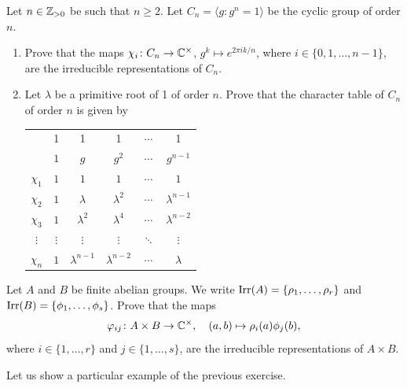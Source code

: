 \begin{exercise}
	Let $n\in\mathbb{Z}_{>0}$ be such that $n\geq2$. Let 
$C_n=\langle g:g^n=1\rangle$ be the cyclic group of order $n$.
\begin{enumerate}
    \item Prove that the maps  
        $\chi_i\colon C_n\to\mathbb{C}^\times$, $g^k\mapsto e^{2\pi ik/n}$, where $i\in\{0,1,\dots,n-1\}$, 
        are the irreducible representations of $C_n$. 
    \item Let $\lambda$ be a primitive root of 1 of order $n$. Prove that 
        the character table of $C_n$ of order $n$ is given by 
	\begin{center}
		\begin{tabular}{|c|ccccc|}
			\hline 
			& 1 & 1 & 1 & $\cdots$ & 1\tabularnewline
			& $1$ & $g$ & $g^2$ & $\cdots$ & $g^{n-1}$\tabularnewline
			\hline 
			$\chi_{1}$ & $1$ & $1$ & $1$ & $\cdots$ & $1$\tabularnewline
			$\chi_{2}$ & $1$ & $\lambda$ & $\lambda^2$ & $\cdots$ & $\lambda^{n-1}$\tabularnewline
			$\chi_{3}$ & $1$ & $\lambda^2$ & $\lambda^4$ & $\cdots$ & $\lambda^{n-2}$\tabularnewline
			$\vdots$ & $\vdots$ & $\vdots$ & $\vdots$ & $\ddots$ & $\vdots$\tabularnewline
			$\chi_{n}$ & $1$ & $\lambda^{n-1}$ & $\lambda^{n-2}$ & $\cdots$ & $\lambda$\tabularnewline
			\hline
		\end{tabular}
	\end{center}
\end{enumerate}
\end{exercise}

\begin{exercise}
    Let $A$ and $B$ be finite abelian groups. We write $\operatorname{Irr}(A)=\{\rho_1,\dots,\rho_r\}$ and 
    $\operatorname{Irr}(B)=\{\phi_1,\dots,\phi_s\}$. Prove
    that the maps 
    \[
    \varphi_{ij}\colon A\times B\to\mathbb{C}^\times,\quad
    (a,b)\mapsto\rho_i(a)\phi_j(b),
    \]
    where $i\in\{1,\dots,r\}$ and $j\in\{1,\dots,s\}$, are the irreducible representations of $A\times B$. 
\end{exercise}

Let us show a particular example of the previous exercise. 

